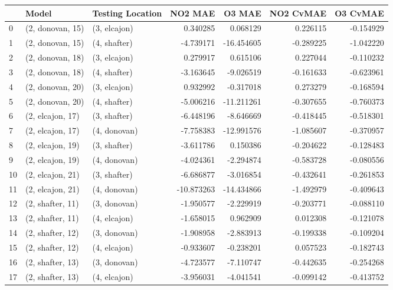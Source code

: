 \begin{tabular}{lllrrrr}
\toprule
{} &             Model & Testing Location &    NO2 MAE &     O3 MAE &  NO2 CvMAE &  O3 CvMAE \\
\midrule
0  &  (2, donovan, 15) &     (3, elcajon) &   0.340285 &   0.068129 &   0.226115 & -0.154929 \\
1  &  (2, donovan, 15) &     (4, shafter) &  -4.739171 & -16.454605 &  -0.289225 & -1.042220 \\
2  &  (2, donovan, 18) &     (3, elcajon) &   0.279917 &   0.615106 &   0.227044 & -0.110232 \\
3  &  (2, donovan, 18) &     (4, shafter) &  -3.163645 &  -9.026519 &  -0.161633 & -0.623961 \\
4  &  (2, donovan, 20) &     (3, elcajon) &   0.932992 &  -0.317018 &   0.273279 & -0.168594 \\
5  &  (2, donovan, 20) &     (4, shafter) &  -5.006216 & -11.211261 &  -0.307655 & -0.760373 \\
6  &  (2, elcajon, 17) &     (3, shafter) &  -6.448196 &  -8.646669 &  -0.418445 & -0.518301 \\
7  &  (2, elcajon, 17) &     (4, donovan) &  -7.758383 & -12.991576 &  -1.085607 & -0.370957 \\
8  &  (2, elcajon, 19) &     (3, shafter) &  -3.611786 &   0.150386 &  -0.204622 & -0.128483 \\
9  &  (2, elcajon, 19) &     (4, donovan) &  -4.024361 &  -2.294874 &  -0.583728 & -0.080556 \\
10 &  (2, elcajon, 21) &     (3, shafter) &  -6.686877 &  -3.016854 &  -0.432641 & -0.261853 \\
11 &  (2, elcajon, 21) &     (4, donovan) & -10.873263 & -14.434866 &  -1.492979 & -0.409643 \\
12 &  (2, shafter, 11) &     (3, donovan) &  -1.950577 &  -2.229919 &  -0.203771 & -0.088110 \\
13 &  (2, shafter, 11) &     (4, elcajon) &  -1.658015 &   0.962909 &   0.012308 & -0.121078 \\
14 &  (2, shafter, 12) &     (3, donovan) &  -1.908958 &  -2.883913 &  -0.199338 & -0.109204 \\
15 &  (2, shafter, 12) &     (4, elcajon) &  -0.933607 &  -0.238201 &   0.057523 & -0.182743 \\
16 &  (2, shafter, 13) &     (3, donovan) &  -4.723577 &  -7.110747 &  -0.442635 & -0.254268 \\
17 &  (2, shafter, 13) &     (4, elcajon) &  -3.956031 &  -4.041541 &  -0.099142 & -0.413752 \\

\end{tabular}
